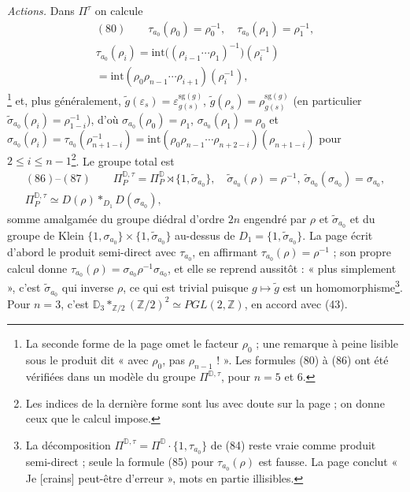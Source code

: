 \documentclass[11pt,a4paper]{article}
\begin{document}
\emph{Actions.} Dans $\Pi^{\tau}$ on calcule
\[
\begin{gathered}
(80)\qquad \tau_{a_0}(\rho_0) = \rho_0^{-1}, \quad \tau_{a_0}(\rho_1) = \rho_1^{-1}, \\
\tau_{a_0}(\rho_i) = \mathrm{int}\bigl((\rho_{i-1}\cdots\rho_1)^{-1}\bigr)(\rho_i^{-1}) \\
= \mathrm{int}(\rho_0\rho_{n-1}\cdots\rho_{i+1})(\rho_i^{-1}),
\end{gathered}
\]\footnote{La
seconde forme de la page omet le facteur $\rho_0$ ; une remarque à peine
lisible sous le produit dit « avec $\rho_0$, pas $\rho_{n-1}$ ! ». Les formules
(80) à (86) ont été vérifiées dans un modèle du groupe
$\Pi^{\mathbb{D},\tau}$, pour $n = 5$ et $6$.}
et, plus généralement, $\tilde g(\varepsilon_s) = \varepsilon_{g(s)}^{\mathrm{sg}(g)}$,
$\tilde g(\rho_s) = \rho_{g(s)}^{\mathrm{sg}(g)}$ (en particulier
$\tilde\sigma_{a_0}(\rho_i) = \rho_{1-i}^{-1}$), d'où
$\sigma_{a_0}(\rho_0) = \rho_1$, $\sigma_{a_0}(\rho_1) = \rho_0$ et
$\sigma_{a_0}(\rho_i) = \tau_{a_0}(\rho_{n+1-i}^{-1}) = \mathrm{int}(\rho_0\rho_{n-1}\cdots\rho_{n+2-i})(\rho_{n+1-i})$
pour $2 \leq i \leq n-1$\footnote{Les indices de la dernière forme sont lus
avec doute sur la page ; on donne ceux que le calcul impose.}. Le groupe
total est
\[
\begin{gathered}
(86)\text{--}(87)\qquad \Pi^{\mathbb{D},\tau}_P = \Pi^{\mathbb{D}}_P \rtimes \{1, \tilde\sigma_{a_0}\},
\quad \tilde\sigma_{a_0}(\rho) = \rho^{-1},\ \tilde\sigma_{a_0}(\sigma_{a_0}) = \sigma_{a_0}, \\
\Pi^{\mathbb{D},\tau}_P \simeq D(\rho) *_{D_1} D(\sigma_{a_0}),
\end{gathered}
\]
somme amalgamée du groupe diédral d'ordre $2n$ engendré par $\rho$ et
$\tilde\sigma_{a_0}$ et du groupe de Klein $\{1, \sigma_{a_0}\} \times \{1, \tilde\sigma_{a_0}\}$
au-dessus de $D_1 = \{1, \tilde\sigma_{a_0}\}$. La page écrit d'abord le
produit semi-direct avec $\tau_{a_0}$, en affirmant
$\tau_{a_0}(\rho) = \rho^{-1}$ ; son propre calcul donne
$\tau_{a_0}(\rho) = \sigma_{a_0}\rho^{-1}\sigma_{a_0}$, et elle se reprend
aussitôt : « plus simplement », c'est $\tilde\sigma_{a_0}$ qui inverse $\rho$,
ce qui est trivial puisque $g \mapsto \tilde g$ est un homomorphisme\footnote{La
décomposition $\Pi^{\mathbb{D},\tau} = \Pi^{\mathbb{D}} \cdot \{1, \tau_{a_0}\}$ de
(84) reste vraie comme produit semi-direct ; seule la formule (85) pour
$\tau_{a_0}(\rho)$ est fausse. La page conclut « Je [crains] peut-être
d'erreur », mots en partie illisibles.}. Pour $n = 3$, c'est
$\mathbb{D}_3 *_{\mathbb{Z}/2} (\mathbb{Z}/2)^2 \simeq PGL(2, \mathbb{Z})$, en
accord avec (43).
\end{document}
